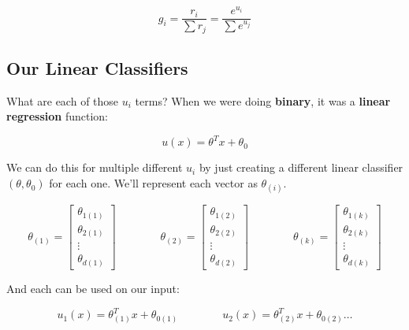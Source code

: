         \begin{equation}
             g_i 
            =             \frac{r_i}{\sum r_j} 
            = 
            \frac{e^{u_i}}{\sum e^{u_j}}
        \end{equation}
        
    \subsection{Our Linear Classifiers}
    
        What are each of those $u_i$ terms? When we were doing \textbf{binary}, it was a \textbf{linear regression} function:
        
        \begin{equation}
            u(x) = \theta^Tx+\theta_0
        \end{equation}
        
        We can do this for multiple different $u_i$ by just creating a different linear classifier $(\theta,\theta_0)$ for each one. We'll represent each vector as $\theta_{(i)}$.
        
        \begin{equation}
            \theta_{(1)} = 
            \begin{bmatrix}
                \theta_{1(1)} \\ \theta_{2(1)} \\ \vdots \\ \theta_{d(1)}
            \end{bmatrix}
            \qquad\qquad
            \theta_{(2)} = 
            \begin{bmatrix}
                \theta_{1(2)} \\ \theta_{2(2)} \\ \vdots \\ \theta_{d(2)}
            \end{bmatrix}
            \qquad\qquad
            \theta_{(k)} = 
            \begin{bmatrix}
                \theta_{1(k)} \\ \theta_{2(k)} \\ \vdots \\ \theta_{d(k)}
            \end{bmatrix}
        \end{equation}
        
        And each can be used on our input:
        
        \begin{equation}
            u_1(x) = \theta_{(1)}^T x + \theta_{0(1)}
            \qquad\qquad
            u_2(x) = \theta_{(2)}^T x + \theta_{0(2)}
            \dots
        \end{equation}
        
